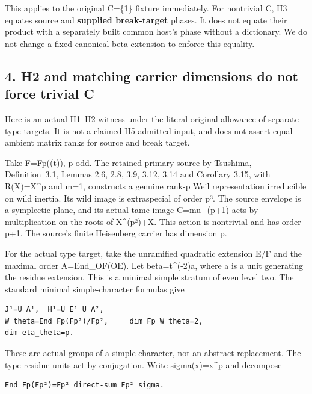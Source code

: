 This applies to the original C=\{1\} fixture immediately. For nontrivial
C, H3 equates source and \textbf{supplied break-target} phases. It does
not equate their product with a separately built common host's phase
without a dictionary. We do not change a fixed canonical beta extension
to enforce this equality.

\hypertarget{stabilizer_contract-h2-and-matching-carrier-dimensions-do-not-force-trivial-c}{%
\subsection{4. H2 and matching carrier dimensions do not force trivial
C}\label{stabilizer_contract-h2-and-matching-carrier-dimensions-do-not-force-trivial-c}}

Here is an actual H1--H2 witness under the literal original allowance of
separate type targets. It is not a claimed H5-admitted input, and does
not assert equal ambient matrix ranks for source and break target.

Take F=Fp((t)), p odd. The retained primary source by Tsushima,
Definition~3.1, Lemmas 2.6, 2.8, 3.9, 3.12, 3.14 and Corollary 3.15, with
R(X)=X\^{}p and m=1, constructs a genuine rank-p Weil representation
irreducible on wild inertia. Its wild image is extraspecial of order p³.
The source envelope is a symplectic plane, and its actual tame image
C=mu\_(p+1) acts by multiplication on the roots of X\^{}(p²)+X. This
action is nontrivial and has order p+1. The source's finite Heisenberg
carrier has dimension p.

For the actual type target, take the unramified quadratic extension E/F
and the maximal order A=End\_OF(OE). Let beta=t\^{}(-2)a, where a is a
unit generating the residue extension. This is a minimal simple stratum
of even level two. The standard minimal simple-character formulas give

\begin{Verbatim}[fontsize=\small,breaklines=true,breakanywhere=true]
J¹=U_A¹,  H¹=U_E¹ U_A²,
W_theta=End_Fp(Fp²)/Fp²,     dim_Fp W_theta=2,
dim eta_theta=p.
\end{Verbatim}

These are actual groups of a simple character, not an abstract
replacement. The type residue units act by conjugation. Write
sigma(x)=x\^{}p and decompose

\begin{Verbatim}[fontsize=\small,breaklines=true,breakanywhere=true]
End_Fp(Fp²)=Fp² direct-sum Fp² sigma.
\end{Verbatim}

